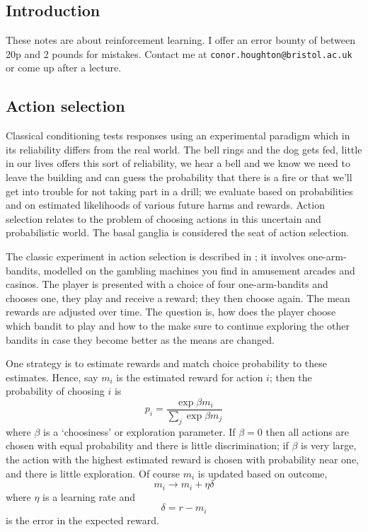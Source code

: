 \documentclass[11pt,a4paper]{scrartcl}
\begin{document}
\subsection*{Introduction}
These notes are about reinforcement learning. I offer an error bounty of
between 20p and 2 pounds for mistakes. Contact me at
\texttt{conor.houghton@bristol.ac.uk} or come up after a lecture.

\subsection*{Action selection}

Classical conditioning tests responses using an experimental paradigm
which in its reliability differs from the real world. The bell rings
and the dog gets fed, little in our lives offers this sort of
reliability, we hear a bell and we know we need to leave the building
and can guess the probability that there is a fire or that we'll get
into trouble for not taking part in a drill; we evaluate based on
probabilities and on estimated likelihoods of various future harms and
rewards. Action selection relates to the problem of choosing actions
in this uncertain and probabilistic world. The basal ganglia is
considered the seat of action selection.

The classic experiment in action selection is described in
\cite{DawEtAl2006a}; it involves one-arm-bandits, modelled on the
gambling machines you find in amusement arcades and casinos. The
player is presented with a choice of four one-arm-bandits and chooses
one, they play and receive a reward; they then choose again. The mean
rewards are adjusted over time. The question is, how does the player
choose which bandit to play and how to the make sure to continue
exploring the other bandits in case they become better as the means
are changed.

One strategy is to estimate rewards and match choice probability to these estimates. Hence, say $m_i$ is the estimated reward for action $i$; then the probability of choosing $i$ is
\begin{equation}
p_i=\frac{\exp{\beta m_i}}{\sum_j\exp{\beta m_j}}
\end{equation}
where $\beta$ is a \lq{}choosiness\rq{} or exploration parameter. If
$\beta=0$ then all actions are chosen with equal probability and there
is little discrimination; if $\beta$ is very large, the action with
the highest estimated reward is chosen with probability near one, and
there is little exploration. Of course $m_i$ is updated based on
outcome, 
\begin{equation}
m_i\rightarrow m_i+\eta \delta
\end{equation}
where $\eta$ is a learning rate and 
\begin{equation}
\delta = r-m_i 
\end{equation}
is the error in the expected reward.
\end{document}
